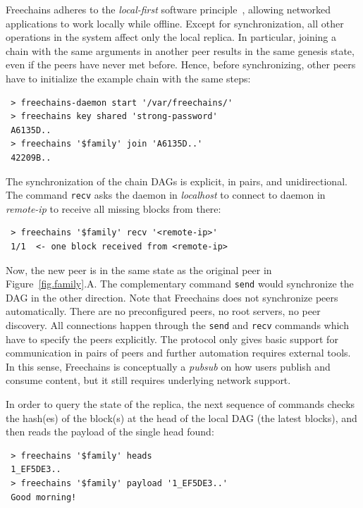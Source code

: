 \documentclass[10pt,journal,compsoc]{IEEEtran}
\newcommand{\FC}       {Freechains\xspace}
\newcommand{\code}[1]  {\texttt{\footnotesize{#1}}}
\begin{document}
\FC adheres to the \emph{local-first} software principle~\cite{p2p.local},
allowing networked applications to work locally while offline.
Except for synchronization, all other operations in the system affect only the
local replica.
In particular, joining a chain with the same arguments in another peer results
in the same genesis state, even if the peers have never met before.
Hence, before synchronizing, other peers have to initialize the example chain
with the same steps:

{\footnotesize
\begin{verbatim}
 > freechains-daemon start '/var/freechains/'
 > freechains key shared 'strong-password'
 A6135D..
 > freechains '$family' join 'A6135D..'
 42209B..
\end{verbatim}
}

The synchronization of the chain DAGs is explicit, in pairs, and
unidirectional.
The command \code{recv} asks the daemon in \emph{localhost} to connect to
daemon in \emph{remote-ip} to receive all missing blocks from there:

{\footnotesize
\begin{verbatim}
 > freechains '$family' recv '<remote-ip>'
 1/1  <- one block received from <remote-ip>
\end{verbatim}
}

Now, the new peer is in the same state as the original peer in
Figure~\ref{fig.family}.A.
The complementary command \code{send} would synchronize the DAG in the other
direction.
Note that \FC does not synchronize peers automatically.
There are no preconfigured peers, no root servers, no peer discovery.
All connections happen through the \code{send} and \code{recv} commands which
have to specify the peers explicitly.
The protocol only gives basic support for communication in pairs of peers and
further automation requires external tools.
In this sense, \FC is conceptually a \emph{pubsub} on how users publish and
consume content, but it still requires underlying network support.

In order to query the state of the replica, the next sequence of commands
checks the hash(es) of the block(s) at the head of the local DAG (the latest
blocks), and then reads the payload of the single head found:


{\footnotesize
\begin{verbatim}
 > freechains '$family' heads
 1_EF5DE3..
 > freechains '$family' payload '1_EF5DE3..'
 Good morning!
\end{verbatim}
}
\end{document}
